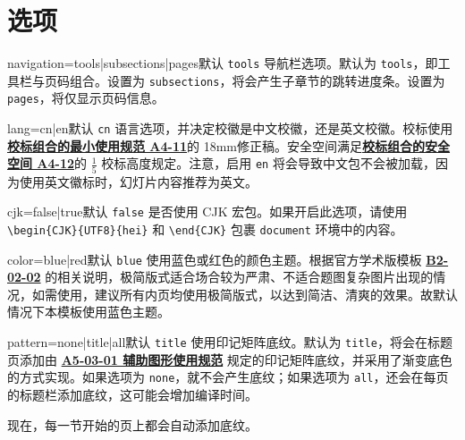\documentclass[a4paper,12pt]{article}
\begin{document}
\section{选项}

\begin{docKey*}[SJTUBeamermin]{navigation}{=tools|subsections|pages}{默认 \texttt{tools}}
    导航栏选项。默认为 \verb"tools"，即工具栏与页码组合。设置为 \verb"subsections"，将会产生子章节的跳转进度条。设置为 \verb"pages"，将仅显示页码信息。
\end{docKey*}

\begin{docKey*}[SJTUBeamermin]{lang}{=cn|en}{默认 \texttt{cn}}
    语言选项，并决定校徽是中文校徽，还是英文校徽。校标使用\href{http://vi.sjtu.edu.cn/index.php/articles/base/4}{\textbf{校标组合的最小使用规范 A4-11}}的 18mm修正稿。安全空间满足\href{http://vi.sjtu.edu.cn/index.php/articles/base/4}{\textbf{校标组合的安全空间 A4-12}}的 $\frac{1}{5}$ 校标高度规定。注意，启用 \texttt{en} 将会导致中文包不会被加载，因为使用英文徽标时，幻灯片内容推荐为英文。
\end{docKey*}

\begin{docKey*}[SJTUBeamermin]{cjk}{=false|true}{默认 \texttt{false}}
    是否使用 \textsf{CJK} 宏包。如果开启此选项，请使用 \verb"\begin{CJK}{UTF8}{hei}" 和 \verb"\end{CJK}" 包裹 \verb"document" 环境中的内容。
\end{docKey*}

\begin{docKey*}[SJTUBeamermin]{color}{=blue|red}{默认 \texttt{blue}}
    使用蓝色或红色的颜色主题。根据官方学术版模板 \href{http://vi.sjtu.edu.cn/index.php/articles/app/8}{\textbf{B2-02-02}} 的相关说明，极简版式适合场合较为严肃、不适合题图复杂图片出现的情况，如需使用，建议所有内页均使用极简版式，以达到简洁、清爽的效果。故默认情况下本模板使用蓝色主题。
\end{docKey*}

\begin{docKey*}[SJTUBeamermin]{pattern}{=none|title|all}{默认 \texttt{title}}
    使用印记矩阵底纹。默认为 \verb"title"，将会在标题页添加由 \href{http://vi.sjtu.edu.cn/index.php/articles/base/5}{\textbf{A5-03-01 辅助图形使用规范}} 规定的印记矩阵底纹，并采用了渐变底色的方式实现。如果选项为 \verb"none"，就不会产生底纹；如果选项为 \verb"all"，还会在每页的标题栏添加底纹，这可能会增加编译时间。

    现在，每一节开始的页上都会自动添加底纹。
\end{docKey*}
\end{document}
